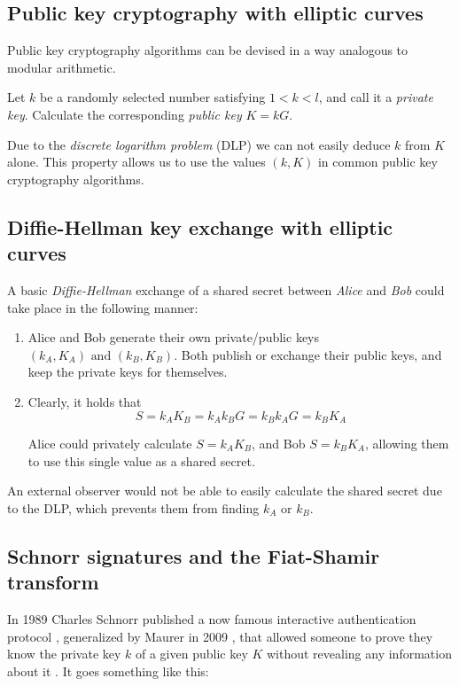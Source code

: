 \subsection{Public key cryptography with elliptic curves}
\label{ec:keys}
Public key cryptography algorithms can be devised in a way analogous to modular arithmetic.

Let \(k\) be a randomly selected number satisfying \(1 < k < l\), and call it a {\em private key}. Calculate the corresponding {\em public key} \(K = k G\). 

Due to the {\em discrete logarithm problem} (DLP) we can not easily deduce \(k\) from \(K\) alone. This property allows us to use the values \( (k, K) \) in common public key cryptography algorithms.


\subsection{Diffie-Hellman key exchange with elliptic curves}
\label{DH_exchange_section}

A basic {\em Diffie-Hellman} \cite{Diffie-Hellman} exchange of a shared secret between {\em Alice} and {\em Bob} could take place in the following manner:

\begin{enumerate}
	
	\item Alice and Bob generate their own private/public keys \((k_A, K_A) \textrm{ and } (k_B, K_B)\). Both publish or exchange their public keys, and keep the private keys for themselves.
	
	\item Clearly, it holds that \[S = k_A K_B = k_A k_B G = k_B k_A G = k_B K_A\]
	
	Alice could privately calculate \(S = k_A K_B\), and Bob \(S = k_B K_A\), allowing them to use this single value as a shared secret.
	
\end{enumerate}   

An external observer would not be able to easily calculate the shared secret due to the DLP, which prevents them from finding $k_A$ or $k_B$.


\subsection{Schnorr signatures and the Fiat-Shamir transform}
\label{sec:schnorr-fiat-shamir}

In 1989 Charles Schnorr published a now famous interactive authentication protocol \cite{schnorr-signatures}, generalized by Maurer in 2009 \cite{simple-zk-proof-maurer}, that allowed someone to prove they know the private key $k$ of a given public key $K$ without revealing any information about it \cite{Signatures2015BorromeanRS}. It goes something like this:

